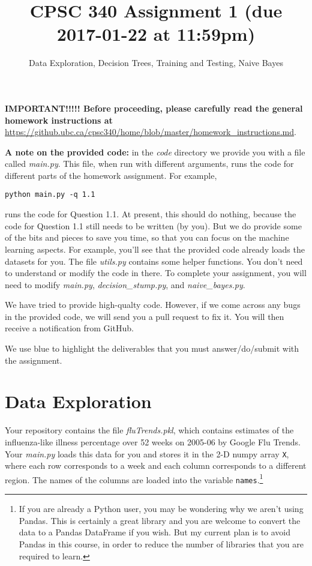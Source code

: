 \documentclass{article}
\def\blu#1{{\color{blu}#1}}
\begin{document}
\title{CPSC 340 Assignment 1 (due 2017-01-22 at 11:59pm)}
\author{Data Exploration, Decision Trees, Training and Testing, Naive Bayes}
\date{}
\maketitle

\textbf{IMPORTANT!!!!! Before proceeding, please carefully read the general homework instructions at} \url{https://github.ubc.ca/cpsc340/home/blob/master/homework_instructions.md}.

\textbf{A note on the provided code:} in the \emph{code} directory we provide you with a file called
\emph{main.py}. This file, when run with different arguments, runs the code for different
parts of the homework assignment. For example,
\begin{verbatim}
python main.py -q 1.1
\end{verbatim}
runs the code for Question 1.1. At present, this should do nothing, because the code
for Question 1.1 still needs to be written (by you). But we do provide some of the bits
and pieces to save you time, so that you can focus on the machine learning aspects. For example, you'll see that the provided code already loads the datasets for you. The file \emph{utils.py} contains some helper functions. You don't need to understand or modify the code in there. To complete your assignment, you will need to modify \emph{main.py}, \emph{decision\_stump.py}, and \emph{naive\_bayes.py}.

We have tried to provide high-qualty code. However, if we come across any bugs in the provided code,
we will send you a pull request to fix it. You will then receive a notification from GitHub.

\vspace{1em}
We use \blu{blue} to highlight the deliverables that you must answer/do/submit with the assignment.

\section{Data Exploration}

Your repository contains the file \emph{fluTrends.pkl}, which contains estimates of the influenza-like illness percentage over 52 weeks on 2005-06 by Google Flu Trends.
Your \emph{main.py} loads this data for you and stores it in the 2-D numpy array \texttt{X}, where each row corresponds to a week and each column corresponds to a different region. The names of the columns are loaded into the variable \texttt{names}.\footnote{If you are already a Python user, you may be wondering why we aren't using Pandas. This is certainly a great library and you are welcome to convert the data to a Pandas DataFrame if you wish. But my current plan is to avoid Pandas in this course, in order to reduce the number of libraries that you are required to learn.}
\end{document}
